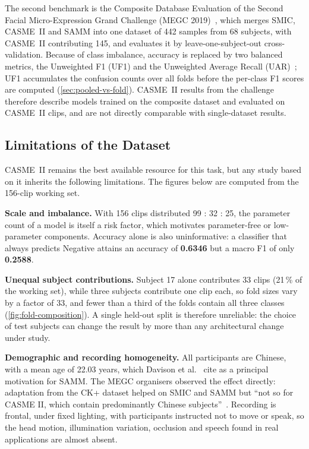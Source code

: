 The second benchmark is the Composite Database Evaluation of the Second Facial Micro-Expression Grand Challenge (MEGC 2019)~\cite{see2019}, which merges SMIC, CASME~II and SAMM into one dataset of 442 samples from 68 subjects, with CASME~II contributing 145, and evaluates it by leave-one-subject-out cross-validation. Because of class imbalance, accuracy is replaced by two balanced metrics, the Unweighted F1 (UF1) and the Unweighted Average Recall (UAR)~\cite{see2019}; UF1 accumulates the confusion counts over all folds before the per-class F1 scores are computed (\autoref{sec:pooled-vs-fold}). CASME~II results from the challenge therefore describe models trained on the composite dataset and evaluated on CASME~II clips, and are not directly comparable with single-dataset results.

\subsection{Limitations of the Dataset}
\label{sec:corpus-threats}

CASME~II remains the best available resource for this task, but any study based on it inherits the following limitations. The figures below are computed from the 156-clip working set.

\textbf{Scale and imbalance.} With 156 clips distributed 99 : 32 : 25, the parameter count of a model is itself a risk factor, which motivates parameter-free or low-parameter components. Accuracy alone is also uninformative: a classifier that always predicts Negative attains an accuracy of \textbf{0.6346} but a macro F1 of only \textbf{0.2588}.

\textbf{Unequal subject contributions.} Subject 17 alone contributes 33 clips (21\,\% of the working set), while three subjects contribute one clip each, so fold sizes vary by a factor of 33, and fewer than a third of the folds contain all three classes (\autoref{fig:fold-composition}). A single held-out split is therefore unreliable: the choice of test subjects can change the result by more than any architectural change under study.

\textbf{Demographic and recording homogeneity.} All participants are Chinese, with a mean age of 22.03 years, which Davison et al.~\cite{davison2018} cite as a principal motivation for SAMM. The MEGC organisers observed the effect directly: adaptation from the CK+ dataset helped on SMIC and SAMM but ``not so for CASME II, which contain predominantly Chinese subjects''~\cite{see2019}. Recording is frontal, under fixed lighting, with participants instructed not to move or speak, so the head motion, illumination variation, occlusion and speech found in real applications are almost absent.

